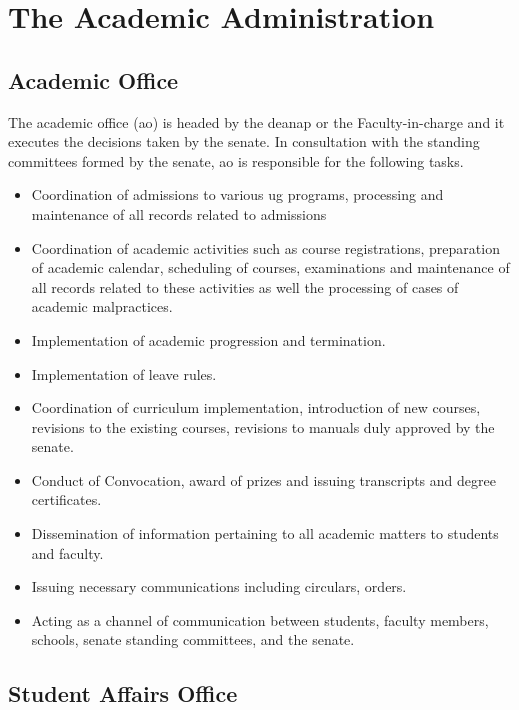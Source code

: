 \section{The Academic Administration}

\subsection{Academic Office}

The academic office (\acrshort{ao}) is headed by the \acrfull{deanap} or the Faculty-in-charge and it executes the decisions taken by the senate. In consultation with the standing committees formed by the \Gls{senate}, \acrshort{ao} is responsible for the following tasks.

\begin{itemize}[leftmargin=15mm]
	\item Coordination of admissions to various \acrshort{ug} programs, processing and maintenance of all records related to admissions
	\item Coordination of academic activities such as course registrations, preparation of academic calendar, scheduling of courses, examinations and maintenance of all records related to these activities as well the processing of cases of academic malpractices.
	\item Implementation of academic progression and termination.
	\item Implementation of leave rules.
	\item Coordination of curriculum implementation, introduction of new courses, revisions to the existing courses, revisions to manuals duly approved by the senate.
	\item Conduct of Convocation, award of prizes and issuing transcripts and degree certificates.
	\item Dissemination of information pertaining to all academic matters to students and faculty.
	\item Issuing necessary communications including circulars, orders. 
	\item Acting as a channel of communication between students, faculty members, schools, senate standing committees, and the senate.
\end{itemize}

\subsection{Student Affairs Office}


